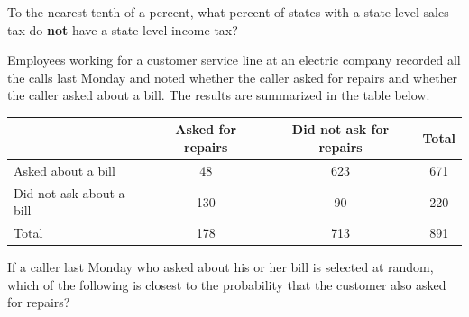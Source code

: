 To the nearest tenth of a percent, what percent of states with a state-level sales tax do \textbf{not} have a state-level income tax?

\vspace{0.75em}


\vspace{2em}

\noindent\markforreview
\vspace{1em}

Employees working for a customer service line at an electric company recorded all the calls last Monday and noted whether the caller asked for repairs and whether the caller asked about a bill.  
The results are summarized in the table below.

\vspace{0.75em}

\begin{tabular}{|l|c|c|c|}
\hline
 & Asked for repairs & Did not ask for repairs & Total \\
\hline
Asked about a bill & 48 & 623 & 671 \\
Did not ask about a bill & 130 & 90 & 220 \\
\hline
Total & 178 & 713 & 891 \\
\hline
\end{tabular}

\vspace{1em}

If a caller last Monday who asked about his or her bill is selected at random, which of the following is closest to the probability that the customer also asked for repairs?

\vspace{0.75em}


\newpage
